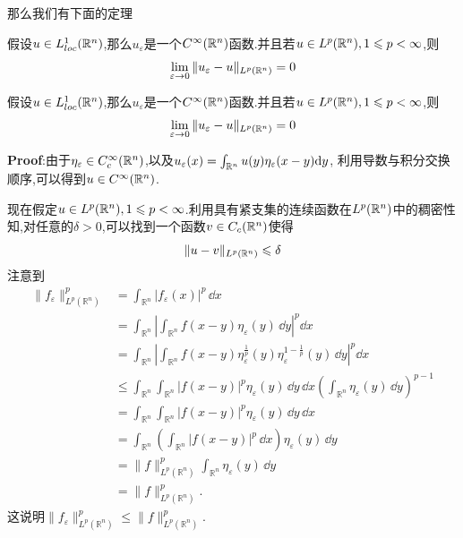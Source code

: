 那么我们有下面的定理
\begin{Theorem}{}
    假设$u\in L^1_{loc}(\mathbb{R} ^n)$,那么$u_{\varepsilon}$是一个$C^{\infty}(\mathbb{R} ^n)$函数.并且若$u\in L^p(\mathbb{R} ^n),1\leqslant p<\infty$,则
    $$
    \lim_{\varepsilon\to 0}\|u_{\varepsilon}-u\|_{L^p(\mathbb{R} ^n)}=0
    $$
\end{Theorem}
\begin{tcolorbox}[colback=KuangNei,colframe=BianKuang,title=\textbf{磨光函数的逼近\hypertarget{磨光函数的逼近}{}},sharpish corners]
    假设$u\in L^1_{loc}(\mathbb{R} ^n)$,那么$u_{\varepsilon}$是一个$C^{\infty}(\mathbb{R} ^n)$函数.并且若$u\in L^p(\mathbb{R} ^n),1\leqslant p<\infty$,则
    $$
    \lim_{\varepsilon\to 0}\|u_{\varepsilon}-u\|_{L^p(\mathbb{R} ^n)}=0
    $$
\end{tcolorbox}
\textbf{Proof}:由于$\eta_{\varepsilon}\in C^{\infty}_c(\mathbb{R} ^n)$,以及$u_{\varepsilon}(x)=\int_{\mathbb{R} ^n}u(y)\eta_{\varepsilon}(x-y)\mathrm{d}y$,
利用导数与积分交换顺序,可以得到$u\in C^{\infty}(\mathbb{R} ^n)$.\par
现在假定$u\in L^p(\mathbb{R} ^n),1\leqslant p<\infty$.利用具有紧支集的连续函数在$L^p(\mathbb{R} ^n)$中的稠密性知,对任意的$\delta>0$,可以找到一个函数$v\in C_{c}(\mathbb{R} ^n)$使得
$$
\|u-v\|_{L^p(\mathbb{R} ^n)}\leqslant \delta
$$
注意到
$$
\begin{aligned}
    \|f_\varepsilon\|_{L^p(\mathbb{R}^n)}^p 
    &= \int_{\mathbb{R}^n} |f_\varepsilon(x)|^p \, \dd x \\
    &= \int_{\mathbb{R}^n} \left| \int_{\mathbb{R}^n} f(x - y) \eta_\varepsilon(y) \, \dd y \right|^p \dd x \\
    &= \int_{\mathbb{R}^n} \left| \int_{\mathbb{R}^n} f(x - y) \eta_\varepsilon^{\frac{1}{p}}(y) \eta_\varepsilon^{1 - \frac{1}{p}}(y) \, \dd y \right|^p \dd x \\
    &\leqslant \int_{\mathbb{R}^n} \int_{\mathbb{R}^n} |f(x - y)|^p \eta_\varepsilon(y) \, \dd y \, \dd x 
    \left( \int_{\mathbb{R}^n} \eta_\varepsilon(y) \, \dd y \right)^{p - 1} \\
    &= \int_{\mathbb{R}^n} \int_{\mathbb{R}^n} |f(x - y)|^p \eta_\varepsilon(y) \, \dd y \, \dd x \\
    &= \int_{\mathbb{R}^n} \left( \int_{\mathbb{R}^n} |f(x - y)|^p \, \dd x \right) \eta_\varepsilon(y) \, \dd y \\
    &= \|f\|_{L^p(\mathbb{R}^n)}^p \int_{\mathbb{R}^n} \eta_\varepsilon(y) \, \dd y \\
    &= \|f\|_{L^p(\mathbb{R}^n)}^p.
\end{aligned}
$$
这说明$ \|f_\varepsilon\|_{L^p(\mathbb{R}^n)}^p \leqslant \|f\|_{L^p(\mathbb{R}^n)}^p$.\par
